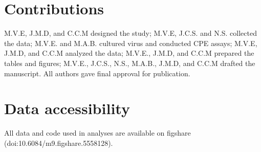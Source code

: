 \documentclass[12pt]{article}
\begin{document}
\section{Contributions}
M.V.E, J.M.D, and C.C.M designed the study; M.V.E, J.C.S. and N.S. collected the data; M.V.E. and M.A.B. cultured virus and conducted CPE assays; M.V.E, J.M.D, and C.C.M analyzed the data; M.V.E., J.M.D, and C.C.M prepared the tables and figures; M.V.E., J.C.S., N.S., M.A.B., J.M.D, and C.C.M drafted the manuscript. All authors gave final approval for publication.

\section{Data accessibility}
All data and code used in analyses are available on figshare (doi:10.6084/m9.figshare.5558128).

\newpage



\end{document}
